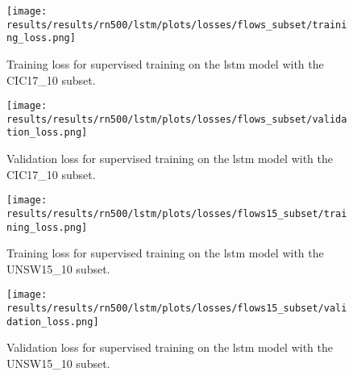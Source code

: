 







\begin{figure}[h]
	\centering
	\texttt{[image: results/results/rn500/lstm/plots/losses/flows\_subset/training\_loss.png]}
	\caption{Training loss for supervised training on the \gls{lstm} model with the CIC17\_10 subset.}
	\label{fig:results:lstm:training_loss_flows_subset}
\end{figure}

\begin{figure}[h]
	\centering
	\texttt{[image: results/results/rn500/lstm/plots/losses/flows\_subset/validation\_loss.png]}
	\caption{Validation loss for supervised training on the \gls{lstm} model with the CIC17\_10 subset.}
	\label{fig:results:lstm:validation_loss_flows_subset}
\end{figure}













\begin{figure}[h]
	\centering
	\texttt{[image: results/results/rn500/lstm/plots/losses/flows15\_subset/training\_loss.png]}
	\caption{Training loss for supervised training on the \gls{lstm} model with the UNSW15\_10 subset.}
	\label{fig:results:lstm:training_loss_flows15_subset}
\end{figure}

\begin{figure}[h]
	\centering
	\texttt{[image: results/results/rn500/lstm/plots/losses/flows15\_subset/validation\_loss.png]}
	\caption{Validation loss for supervised training on the \gls{lstm} model with the UNSW15\_10 subset.}
	\label{fig:results:lstm:validation_loss_flows15_subset}
\end{figure}

